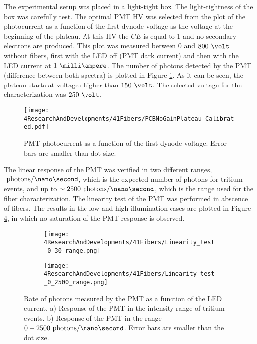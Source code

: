The experimental setup was placed in a light-tight box. The light-tightness of the box was carefully test. The optimal PMT HV was selected from the plot of the photocurrent as a function of the first dynode voltage as the voltage at the beginning of the plateau. At this HV the $CE$ is equal to 1 and no secondary electrons are produced. This plot was measured between $0$ and $800~\volt$ without fibers, first with the LED off (PMT dark current) and then with the LED current at $1~\milli\ampere$. The number of photons detected by the PMT (difference between both spectra) is plotted in Figure \ref{fig:PlateauNoGainPMT}. As it can be seen, the plateau starts at voltages higher than $150~\volt$. The selected voltage for the characterization was $250~\volt$.

\begin{figure}[h]
\centering
\texttt{[image: 4ResearchAndDevelopments/41Fibers/PCBNoGainPlateau\_Calibrated.pdf]}
\caption{PMT photocurrent as a function of the first dynode voltage. Error bars are smaller than dot size.\label{fig:PlateauNoGainPMT}}
\end{figure}

The linear response of the PMT was verified in two different ranges, $~\text{photons}/\nano\second$, which is the expected number of photons for tritium events, and up to $\sim 2500~\text{photons}/\nano\second$, which is the range used for the fiber characterization. The linearity test of the PMT was performed in abscence of fibers. The results in the low and high illumination cases are plotted in Figure \ref{fig:LinearityRangesOfPMT}, in which no saturation of the PMT response is observed.

\begin{figure}
\centering
    \begin{subfigure}[b]{1\textwidth}
    \centering
    \texttt{[image: 4ResearchAndDevelopments/41Fibers/Linearity\_test\_0\_30\_range.png]}  
    \caption{\label{subfig:LinearityTritiumRange}}
    \end{subfigure}
    \hfill
    \begin{subfigure}[b]{1\textwidth}
    \centering
    \texttt{[image: 4ResearchAndDevelopments/41Fibers/Linearity\_test\_0\_2500\_range.png]}  
    \caption{\label{subfig:LinearityStudyRange}}
    \end{subfigure}
 \caption{Rate of photons measured by the PMT as a function of the LED current. a) Response of the PMT in the intensity range of tritium events. b) Response of the PMT in the range $0-2500~\text{photons}/\nano\second$. Error bars are smaller than the dot size.}
 \label{fig:LinearityRangesOfPMT}
\end{figure}